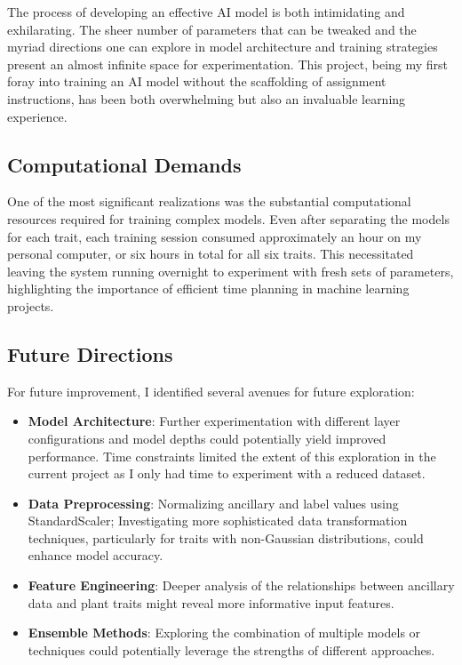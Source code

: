\documentclass{article}
\begin{document}
The process of developing an effective AI model is both intimidating and exhilarating. The sheer number of parameters that can be tweaked and the myriad directions one can explore in model architecture and training strategies present an almost infinite space for experimentation. This project, being my first foray into training an AI model without the scaffolding of assignment instructions, has been both overwhelming but also an invaluable learning experience.

\subsection{Computational Demands}

One of the most significant realizations was the substantial computational resources required for training complex models. Even after separating the models for each trait, each training session consumed approximately an hour on my personal computer, or six hours in total for all six traits. This necessitated leaving the system running overnight to experiment with fresh sets of parameters, highlighting the importance of efficient time planning in machine learning projects.

\subsection{Future Directions}

For future improvement, I identified several avenues for future exploration:

\begin{itemize}
    \item \textbf{Model Architecture}: Further experimentation with different layer configurations and model depths could potentially yield improved performance. Time constraints limited the extent of this exploration in the current project as I only had time to experiment with a reduced dataset.
    
    \item \textbf{Data Preprocessing}: Normalizing ancillary and label values using StandardScaler; Investigating more sophisticated data transformation techniques, particularly for traits with non-Gaussian distributions, could enhance model accuracy.
    
    \item \textbf{Feature Engineering}: Deeper analysis of the relationships between ancillary data and plant traits might reveal more informative input features.
    
    \item \textbf{Ensemble Methods}: Exploring the combination of multiple models or techniques could potentially leverage the strengths of different approaches.
\end{itemize}
\end{document}
